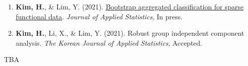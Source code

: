 \documentclass[11pt, a4paper]{awesome-cv} %
\begin{document}
%
%	
%	
%

%

	
%	
%	
	
	
\begin{enumerate}
	\item {\bf Kim, H.}, \& Lim, Y. (2021). \href{https://doi.org/10.1080/02664763.2021.1889997}{Bootstrap aggregated classification for sparse functional data}. {\em Journal of Applied Statistics}, In press.
	\item {\bf Kim, H.}, Li, X., \& Lim, Y. (2021). Robust group independent component analysis. {\em The Korean Journal of Applied Statistics}, Accepted.
\end{enumerate}




TBA
%	
\end{document}
